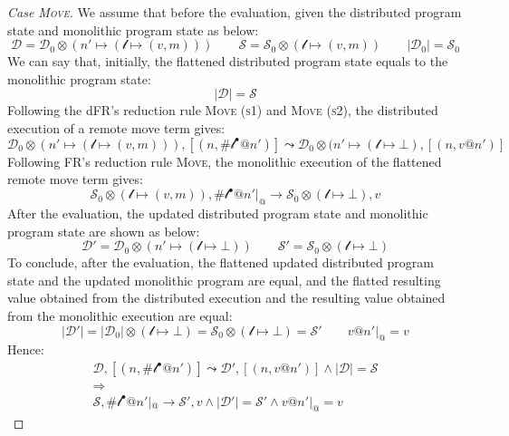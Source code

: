 \begin{proof}[Case \textsc{\emph{Move}}]
We assume that before the evaluation, given the distributed program state and monolithic program state as below:
\[\mathcal{D} = \mathcal{D}_0 \otimes (n' \mapsto (\mathscr{l}\mapsto (v, m)))\quad\quad
\mathcal{S} = \mathcal{S}_0 \otimes (\mathscr{l} \mapsto (v, m))\quad\quad
|\mathcal{D}_0| = \mathcal{S}_0\]
We can say that, initially, the flattened distributed program state equals to the monolithic program state:
\[|\mathcal{D}| = \mathcal{S}\]
Following the dFR's reduction rule \textsc{Move (s1)} and \textsc{Move (s2)}, the distributed execution of a remote move term gives:
\[\mathcal{D}_0 \otimes (n' \mapsto (\mathscr{l} \mapsto (v,m))) , [(n, \#\mathscr{l}^\bullet@n')] \leadsto \mathcal{D}_0 \otimes (n' \mapsto (\mathscr{l} \mapsto \bot), [(n, v@n')]\]
Following FR's reduction rule \textsc{Move}, the monolithic execution of the flattened remote move term gives:
\[\mathcal{S}_0 \otimes (\mathscr{l} \mapsto (v, m)), \#\mathscr{l}^\bullet@n'|_@ \longrightarrow \mathcal{S}_0 \otimes (\mathscr{l} \mapsto \bot), v\]
After the evaluation, the updated distributed program state and monolithic program state are shown as below:
\[\mathcal{D}' = \mathcal{D}_0 \otimes (n' \mapsto (\mathscr{l} \mapsto \bot)) \quad\quad \mathcal{S}' = \mathcal{S}_0 \otimes (\mathscr{l} \mapsto \bot)\]
To conclude, after the evaluation, the flattened updated distributed program state and the updated monolithic program are equal, and the flatted resulting value obtained from the distributed execution and the resulting value obtained from the monolithic execution are equal:
\[|\mathcal{D}'| = |\mathcal{D}_0| \otimes (\mathscr{l} \mapsto \bot) = \mathcal{S}_0 \otimes (\mathscr{l} \mapsto \bot) = \mathcal{S}' \quad\quad v@n'|_@ = v\]
Hence:
\begin{gather*}
\mathcal{D}, [(n, \#\mathscr{l}^\bullet@n')] \leadsto \mathcal{D'}, [(n, v@n')] \land |\mathcal{D}| = \mathcal{S} \\\Rightarrow\\ \mathcal{S}, \#\mathscr{l}^\bullet@n'|_@ \longrightarrow \mathcal{S'}, v \land |\mathcal{D}'| = \mathcal{S}' \land v@n'|_@ = v
\end{gather*}

\end{proof}
